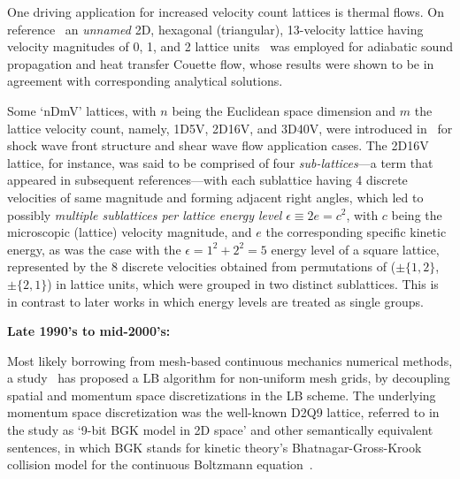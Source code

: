     One    driving    application     for     increased     velocity     count     lattices     is     thermal     flows.     On
    reference~\cite{1993-AlexanderFJ+SterlingJD-PhysRevE} an \emph{unnamed}  2D,  hexagonal  (triangular),  13-velocity  lattice
    having velocity magnitudes of 0,  1,  and  2  lattice  units~\cite{1998-ChenS+DoolenGD-AnnuRevFluidMech}  was  employed  for
    adiabatic sound propagation and heat transfer Couette flow, whose results were shown to be in agreement  with  corresponding
    analytical solutions.

    Some `nDmV' lattices, with $n$ being the Euclidean space dimension and $m$ the lattice velocity count, namely, 1D5V,  2D16V,
    and 3D40V, were introduced in~\cite{1994-ChenY+AkiyamaM-PhysRevE} for  shock  wave  front  structure  and  shear  wave  flow
    application cases. The 2D16V lattice, for instance, was said to be  comprised  of  four  \emph{sub-lattices}---a  term  that
    appeared in subsequent references---with each sublattice having 4 discrete velocities of same magnitude and forming adjacent
    right angles, which led to possibly \emph{multiple sublattices per lattice energy level} $\epsilon \equiv 2e  =  c^2$,  with
    $c$ being the microscopic (lattice) velocity magnitude, and $e$ the corresponding specific kinetic energy, as was  the  case
    with the $\epsilon = 1^2 + 2^2 = 5$ energy level of a square lattice, represented by the 8 discrete velocities obtained from
    permutations of ($\pm\{1,2\}$, $\pm\{2,1\}$) in lattice units, which were grouped in two distinct sublattices.  This  is  in
    contrast to later works in which energy levels are treated as single groups.


    \vspace{2.0mm}\noindent\textbf{Late 1990's to mid-2000's:}\vspace{1.0mm}

    Most likely borrowing from mesh-based continuous mechanics numerical methods, a study~\cite{1996-HeX+DemboM-JComputPhys} has
    proposed a LB algorithm for non-uniform mesh grids, by decoupling spatial and  momentum  space  discretizations  in  the  LB
    scheme. The underlying momentum space discretization was the well-known D2Q9 lattice, referred to in the study as `9-bit BGK
    model  in  2D  space'  and  other  semantically  equivalent  sentences,  in  which   BGK   stands   for   kinetic   theory's
    Bhatnagar-Gross-Krook  collision  model  for  the   continuous   Boltzmann   equation~\cite{1954-BhatnagarPL+KrookM-PhysRev,
    2003-LiboffRL-bookSpringer, 2011-HarrisS-Dover}.

